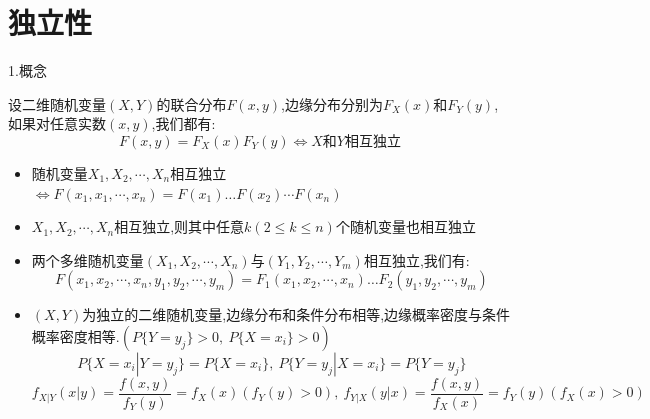 \section{独立性}
\begin{definition}[独立性]
	1.概念
	
	设二维随机变量$(X,Y)$的联合分布$F(x,y)$,边缘分布分别为$F_{X}(x)$和$F_{Y}(y)$,如果对任意实数$(x,y)$,我们都有: 
	$$F(x,y)=F_{X}(x)F_{Y}(y)\Leftrightarrow X\text{和}Y\text{相互独立}$$
	
	\begin{itemize}
		\item 随机变量$X_{1},X_{2},\cdots,X_{n}$相互独立$\Leftrightarrow F(x_{1},x_{1},\cdots,x_{n})=F(x_{1})\dots F(x_{2})\cdots F(x_{n})$
		\item $X_{1},X_{2},\cdots,X_{n}$相互独立,则其中任意$k(2\leq k\leq n)$个随机变量也相互独立
		\item 两个多维随机变量$(X_{1},X_{2},\cdots,X_{n})$与$(Y_{1},Y_{2},\cdots,Y_{m})$相互独立,我们有: 
		$$F(x_{1},x_{2},\cdots,x_{n},y_{1},y_{2},\cdots,y_{m})=F_{1}(x_{1},x_{2},\cdots,x_{n})\dots F_{2}(y_{1},y_{2},\cdots,y_{m})$$
		\item $(X,Y)$为独立的二维随机变量,边缘分布和条件分布相等,边缘概率密度与条件概率密度相等.$(P\{Y=y_{j}\}>0,\ P\{X=x_{i}\}>0)$
		$$P\{X=x_{i}|Y=y_{j}\}=P\{X=x_{i}\},\ P\{Y=y_{j}|X=x_{i}\}=P\{Y=y_{j}\}$$
		$$f_{X|Y}(x|y)=\dfrac{f(x,y)}{f_{Y}(y)}=f_{X}(x)(f_{Y}(y)>0),\ f_{Y|X}(y|x)=\dfrac{f(x,y)}{f_{X}(x)}=f_{Y}(y)(f_{X}(x)>0)$$
	\end{itemize}
\end{definition}
